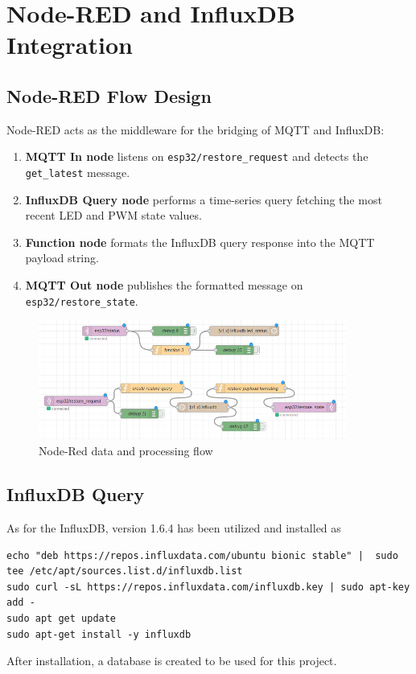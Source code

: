 \documentclass[a4paper,12pt]{article}
\begin{document}
\section{Node-RED and InfluxDB Integration}

\subsection{Node-RED Flow Design}

Node-RED acts as the middleware for the bridging of MQTT and InfluxDB:

\begin{enumerate}
    \item \textbf{MQTT In node} listens on \texttt{esp32/restore\_request} and 
	    detects the \texttt{get\_latest} message.
    \item \textbf{InfluxDB Query node} performs a time-series query 
	    fetching the most recent LED and PWM state values.
    \item \textbf{Function node} formats the InfluxDB query response 
	    into the MQTT payload string.
    \item \textbf{MQTT Out node} publishes the 
	    formatted message on \texttt{esp32/restore\_state}.
\end{enumerate}


		\begin{figure}[H]
			\centering
			\includegraphics[width=0.9\textwidth]{node1.png}
			\caption{Node-Red data and processing flow}
			\label{fig1:}
		\end{figure}		



\subsection{InfluxDB Query}

As for the InfluxDB, version 1.6.4 has been utilized and installed
as 
{\scriptsize
\begin{verbatim} 
echo "deb https://repos.influxdata.com/ubuntu bionic stable" |  sudo tee /etc/apt/sources.list.d/influxdb.list
sudo curl -sL https://repos.influxdata.com/influxdb.key | sudo apt-key add -
sudo apt get update
sudo apt-get install -y influxdb
\end{verbatim}
}
After installation, a database is created to be used for this project.
\end{document}
